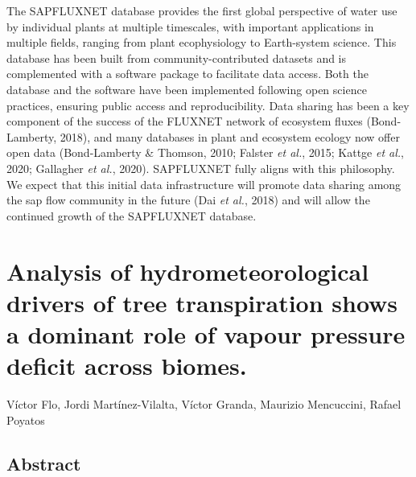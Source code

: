 \documentclass[11pt,twoside]{reedthesis}
\begin{document}
The SAPFLUXNET database provides the first global perspective of water
use by individual plants at multiple timescales, with important
applications in multiple fields, ranging from plant ecophysiology to
Earth-system science. This database has been built from
community-contributed datasets and is complemented with a software
package to facilitate data access. Both the database and the software
have been implemented following open science practices, ensuring public
access and reproducibility. Data sharing has been a key component of the
success of the FLUXNET network of ecosystem fluxes (Bond-Lamberty,
2018), and many databases in plant and ecosystem ecology now offer open
data (Bond-Lamberty \& Thomson, 2010; Falster \emph{et al.}, 2015;
Kattge \emph{et al.}, 2020; Gallagher \emph{et al.}, 2020). SAPFLUXNET
fully aligns with this philosophy. We expect that this initial data
infrastructure will promote data sharing among the sap flow community in
the future (Dai \emph{et al.}, 2018) and will allow the continued growth
of the SAPFLUXNET database. \newpage\null\newpage

\chapter[Analysis of hydrometeorological drivers.]{Analysis of hydrometeorological drivers of tree transpiration shows a dominant role of vapour pressure deficit across biomes.}

\setlength{\parindent}{0pt} Víctor Flo, Jordi Martínez-Vilalta, Víctor
Granda, Maurizio Mencuccini, Rafael Poyatos \newpage
\setlength{\parindent}{30pt}

\section*{Abstract}
\end{document}
